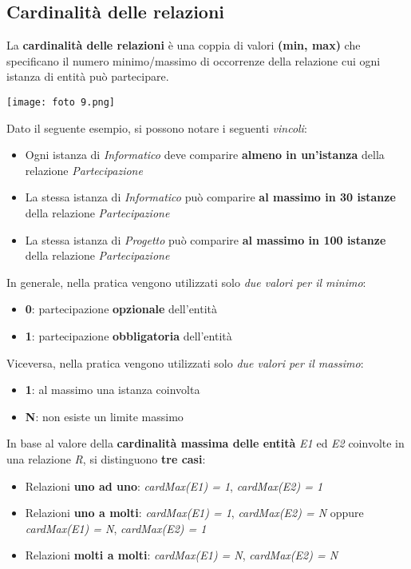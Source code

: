 \documentclass{article}
\begin{document}
\subsection*{Cardinalità delle relazioni}
\large

La \textbf{cardinalità delle relazioni} è una coppia di valori \textbf{(min, max)} che specificano il numero minimo/massimo di occorrenze della relazione cui ogni istanza di entità può partecipare. 
\begin{center}
    \texttt{[image: foto 9.png]}
\end{center}
Dato il seguente esempio, si possono notare i seguenti \textit{vincoli}:
\begin{itemize}[label={-}, leftmargin=1cm]
    \item Ogni istanza di \textit{Informatico} deve comparire \textbf{almeno in un'istanza} della relazione \textit{Partecipazione}
    \item La stessa istanza di \textit{Informatico} può comparire \textbf{al massimo in 30 istanze} della relazione \textit{Partecipazione}
    \item La stessa istanza di \textit{Progetto} può comparire \textbf{al massimo in 100 istanze} della relazione \textit{Partecipazione}
\end{itemize}
In generale, nella pratica vengono utilizzati solo \textit{due valori per il minimo}:
\begin{itemize}[label={-}, leftmargin=1cm]
    \item \textbf{0}: partecipazione \textbf{opzionale} dell'entità
    \item \textbf{1}: partecipazione \textbf{obbligatoria} dell'entità
\end{itemize}
Viceversa, nella pratica vengono utilizzati solo \textit{due valori per il massimo}:
\begin{itemize}[label={-}, leftmargin=1cm]
    \item \textbf{1}: al massimo una istanza coinvolta
    \item \textbf{N}: non esiste un limite massimo\\
\end{itemize}
In base al valore della \textbf{cardinalità massima delle entità} \textit{E1} ed \textit{E2} coinvolte in una relazione \textit{R}, si distinguono \textbf{tre casi}:
\begin{itemize}[label={-}, leftmargin=1cm]
    \item Relazioni \textbf{uno ad uno}: \textit{cardMax(E1) = 1}, \textit{cardMax(E2) = 1}
    \item Relazioni \textbf{uno a molti}: \textit{cardMax(E1) = 1}, \textit{cardMax(E2) = N} oppure \textit{cardMax(E1) = N}, \textit{cardMax(E2) = 1}
    \item Relazioni \textbf{molti a molti}: \textit{cardMax(E1) = N}, \textit{cardMax(E2) = N}
\end{itemize}
\end{document}
